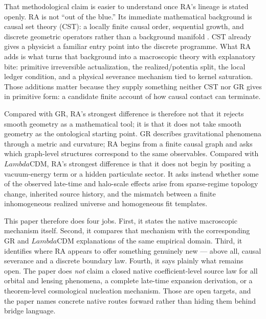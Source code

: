 \documentclass[11pt]{article}
\def\Lambda{Lambda}%
\begin{document}
That methodological claim is easier to understand once RA's lineage is stated openly. RA is not ``out of the blue.'' Its immediate mathematical background is causal set theory (CST): a locally finite causal order, sequential growth, and discrete geometric operators rather than a background manifold \cite{Bombelli1987,Sorkin1997,Rideout2000,Benincasa2010,Dowker2013}. CST already gives a physicist a familiar entry point into the discrete programme. What RA adds is what turns that background into a macroscopic theory with explanatory bite: primitive irreversible actualization, the realized/potentia split, the local ledger condition, and a physical severance mechanism tied to kernel saturation. Those additions matter because they supply something neither CST nor GR gives in primitive form: a candidate finite account of how causal contact can terminate.

Compared with GR, RA's strongest difference is therefore not that it rejects smooth geometry as a mathematical tool; it is that it does not take smooth geometry as the ontological starting point. GR describes gravitational phenomena through a metric and curvature; RA begins from a finite causal graph and asks which graph-level structures correspond to the same observables. Compared with $\Lambda$CDM, RA's strongest difference is that it does not begin by positing a vacuum-energy term or a hidden particulate sector. It asks instead whether some of the observed late-time and halo-scale effects arise from sparse-regime topology change, inherited source history, and the mismatch between a finite inhomogeneous realized universe and homogeneous fit templates.

This paper therefore does four jobs. First, it states the native macroscopic mechanism itself. Second, it compares that mechanism with the corresponding GR and $\Lambda$CDM explanations of the same empirical domain. Third, it identifies where RA appears to offer something genuinely new --- above all, causal severance and a discrete boundary law. Fourth, it says plainly what remains open. The paper does \emph{not} claim a closed native coefficient-level source law for all orbital and lensing phenomena, a complete late-time expansion derivation, or a theorem-level cosmological nucleation mechanism. Those are open targets, and the paper names concrete native routes forward rather than hiding them behind bridge language.

\end{document}
